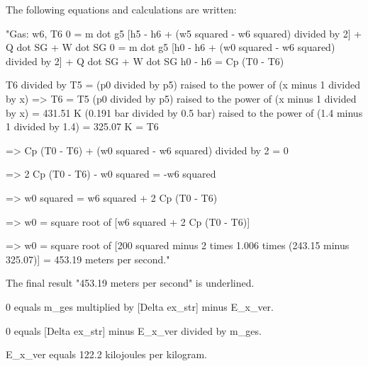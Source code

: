 The following equations and calculations are written:  

"Gas: w6, T6  
0 = m dot g5 [h5 - h6 + (w5 squared - w6 squared) divided by 2] + Q dot SG + W dot SG  
0 = m dot g5 [h0 - h6 + (w0 squared - w6 squared) divided by 2] + Q dot SG + W dot SG  
h0 - h6 = Cp (T0 - T6)  

T6 divided by T5 = (p0 divided by p5) raised to the power of (x minus 1 divided by x)  
=> T6 = T5 (p0 divided by p5) raised to the power of (x minus 1 divided by x) = 431.51 K (0.191 bar divided by 0.5 bar) raised to the power of (1.4 minus 1 divided by 1.4) = 325.07 K = T6  

=> Cp (T0 - T6) + (w0 squared - w6 squared) divided by 2 = 0  

=> 2 Cp (T0 - T6) - w0 squared = -w6 squared  

=> w0 squared = w6 squared + 2 Cp (T0 - T6)  

=> w0 = square root of [w6 squared + 2 Cp (T0 - T6)]  

=> w0 = square root of [200 squared minus 2 times 1.006 times (243.15 minus 325.07)] = 453.19 meters per second."  

The final result "453.19 meters per second" is underlined.

0 equals m_ges multiplied by [Delta ex_str] minus E_x_ver.  

0 equals [Delta ex_str] minus E_x_ver divided by m_ges.  

E_x_ver equals 122.2 kilojoules per kilogram.
